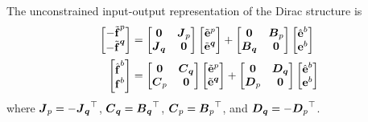 The unconstrained input-output representation of the Dirac structure is
\begin{align}
  \begin{bmatrix}
    -\tilde{\dcovectr{f}}^{p} \\
    -\tilde{\dcovectr{f}}^{\covectr{q}}
  \end{bmatrix} &= \begin{bmatrix}
    \dcovectr{0} & \matr{J}_{p} \\
    \matr{J}_{\covectr{q}} & \dcovectr{0}
  \end{bmatrix}\begin{bmatrix}
    \tilde{\dcovectr{e}}^{p} \\
    \tilde{\dcovectr{e}}^{\covectr{q}}
  \end{bmatrix}+\begin{bmatrix}
  \dcovectr{0} & \matr{B}_{p} \\
  \matr{B}_{\covectr{q}} & \dcovectr{0}
  \end{bmatrix}\begin{bmatrix}
    \hat{\dcovectr{e}}^{b} \\
    \dcovectr{e}^{b}
  \end{bmatrix} \\
  \begin{bmatrix}
    \hat{\dcovectr{f}}^{b} \\
    \dcovectr{f}^{b}
  \end{bmatrix} &= \begin{bmatrix}
    \dcovectr{0} & \matr{C}_{\covectr{q}} \\
    \matr{C}_{p} & \dcovectr{0}
  \end{bmatrix}\begin{bmatrix}
    \tilde{\dcovectr{e}}^{p} \\
    \tilde{\dcovectr{e}}^{\covectr{q}}
  \end{bmatrix}+\begin{bmatrix}
  \dcovectr{0} & \matr{D}_{\covectr{q}} \\
  \matr{D}_{p} & \dcovectr{0}
  \end{bmatrix}\begin{bmatrix}
    \hat{\dcovectr{e}}^{b} \\
    \dcovectr{e}^{b}
  \end{bmatrix}
\end{align}
where $\matr{J}_{p}=-\transpose{\matr{J}_{\covectr{q}}}$,
$\matr{C}_{\covectr{q}}=\transpose{\matr{B}_{\covectr{q}}}$,
$\matr{C}_{p}=\transpose{\matr{B}_{p}}$, and
$\matr{D}_{\covectr{q}}=-\transpose{\matr{D}_{p}}$.

